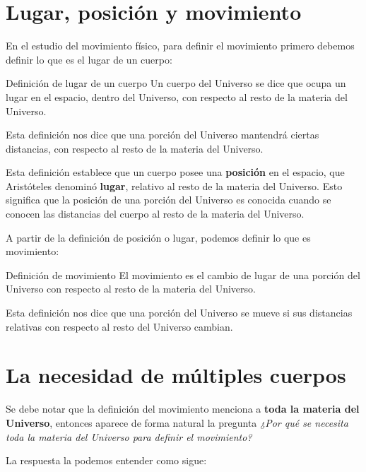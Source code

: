 \documentclass[../apunte_mecanica_clasica.tex]{subfiles}%
\begin{document}
\clearpage

\section{Lugar, posición y movimiento}

En el estudio del movimiento físico, para definir el movimiento primero debemos definir lo que es el lugar de un cuerpo:

\begin{apuntebloque}{Definición de lugar de un cuerpo}
Un cuerpo del Universo se dice que ocupa un lugar en el espacio, dentro del Universo, con respecto al resto de la materia del Universo.
\end{apuntebloque}

Esta definición nos dice que una porción del Universo mantendrá ciertas distancias, con respecto al resto de la materia del Universo.

Esta definición establece que un cuerpo posee una \textbf{posición} en el espacio, que Aristóteles denominó \textbf{lugar}, relativo al resto de la materia del Universo. Esto significa que la posición de una porción del Universo es conocida cuando se conocen las distancias del cuerpo al resto de la materia del Universo.

A partir de la definición de posición o lugar, podemos definir lo que es movimiento:

\begin{apuntebloque}{Definición de movimiento}
El movimiento es el cambio de lugar de una porción del Universo con respecto al resto de la materia del Universo.
\end{apuntebloque}

Esta definición nos dice que una porción del Universo se mueve si sus distancias relativas con respecto al resto del Universo cambian.

\section{La necesidad de múltiples cuerpos}

Se debe notar que la definición del movimiento menciona a \textbf{toda la materia del Universo}, entonces aparece de forma natural la pregunta \textit{¿Por qué se necesita toda la materia del Universo para definir el movimiento?}
 
La respuesta la podemos entender como sigue: 
\end{document}
